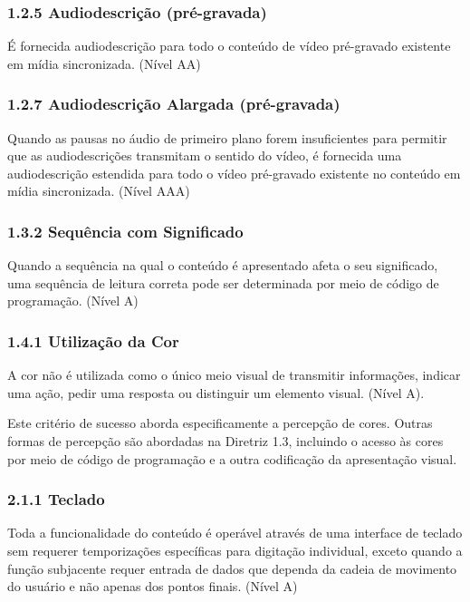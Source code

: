 \documentclass[a4paper]{article}
\begin{document}
\begin{titlepage}
\subsubsection{1.2.5 Audiodescrição (pré-gravada)}

É fornecida audiodescrição para todo o conteúdo de vídeo pré-gravado existente em mídia sincronizada. (Nível AA)

\subsubsection{1.2.7 Audiodescrição Alargada (pré-gravada)}

Quando as pausas no áudio de primeiro plano forem insuficientes para permitir que as audiodescrições transmitam o sentido do vídeo, é fornecida uma audiodescrição estendida para todo o vídeo pré-gravado existente no conteúdo em mídia sincronizada. (Nível AAA)

\subsubsection{1.3.2 Sequência com Significado}

Quando a sequência na qual o conteúdo é apresentado afeta o seu significado, uma sequência de leitura correta pode ser determinada por meio de código de programação. (Nível A)

\subsubsection{1.4.1 Utilização da Cor}

A cor não é utilizada como o único meio visual de transmitir informações, indicar uma ação, pedir uma resposta ou distinguir um elemento visual. (Nível A). 

Este critério de sucesso aborda especificamente a percepção de cores. Outras formas de percepção são abordadas na Diretriz 1.3, incluindo o acesso às cores por meio de código de programação e a outra codificação da apresentação visual.

\subsubsection{2.1.1 Teclado}

Toda a funcionalidade do conteúdo é operável através de uma interface de teclado sem requerer temporizações específicas para digitação individual, exceto quando a função subjacente requer entrada de dados que dependa da cadeia de movimento do usuário e não apenas dos pontos finais. (Nível A)


\end{titlepage}
\end{document}
